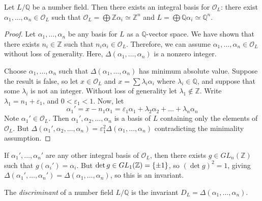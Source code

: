 \begin{theorem}
    Let \( L / \mathbb Q \) be a number field.
    Then there exists an integral basis for \( \mathcal O_L \): there exist \( \alpha_1, \dots, \alpha_n \in \mathcal O_L \) such that \( \mathcal O_L = \bigoplus \mathbb Z \alpha_i \simeq \mathbb Z^n \) and \( L = \bigoplus \mathbb Q \alpha_i \simeq \mathbb Q^n \).
\end{theorem}
\begin{proof}
    Let \( \alpha_1, \dots, \alpha_n \) be any basis for \( L \) as a \( \mathbb Q \)-vector space.
    We have shown that there exists \( n_i \in \mathbb Z \) such that \( n_i \alpha_i \in \mathcal O_L \).
    Therefore, we can assume \( \alpha_1, \dots, \alpha_n \in \mathcal O_L \) without loss of generality.
    Here, \( \Delta(\alpha_1, \dots, \alpha_n) \) is a nonzero integer.

    Choose \( \alpha_1, \dots, \alpha_n \) such that \( \Delta(\alpha_1, \dots, \alpha_n) \) has minimum absolute value.
    Suppose the result is false, so let \( x \in \mathcal O_L \) and \( x = \sum \lambda_i \alpha_i \) where \( \lambda_i \in \mathbb Q \), and suppose that some \( \lambda_i \) is not an integer.
    Without loss of generality let \( \lambda_1 \not\in \mathbb Z \).
    Write \( \lambda_1 = n_1 + \varepsilon_1 \), and \( 0 < \varepsilon_1 < 1 \).
    Now, let
    \[ \alpha_1' = x - n_1 \alpha_1 = \varepsilon_1 \alpha_1 + \lambda_2 \alpha_2 + \dots + \lambda_n \alpha_n \]
    Note \( \alpha_1' \in \mathcal O_L \).
    Then \( \alpha_1', \alpha_2, \dots, \alpha_n \) is a basis of \( L \) containing only the elements of \( \mathcal O_L \).
    But \( \Delta(\alpha_1', \alpha_2, \dots, \alpha_n) = \varepsilon_1^2 \Delta(\alpha_1, \dots, \alpha_n) \) contradicting the minimality assumption.
\end{proof}
\begin{remark}
    If \( \alpha_1', \dots, \alpha_n' \) are any other integral basis of \( \mathcal O_L \), then there exists \( g \in GL_n(\mathbb Z) \) such that \( g(\alpha_i') = \alpha_i \).
    But \( \det g \in GL_1(\mathbb Z) = \qty{\pm 1} \), so \( (\det g)^2 = 1 \), giving \( \Delta(\alpha_1', \dots, \alpha_n') = \Delta(\alpha_1, \dots, \alpha_n) \), so this is an invariant.
\end{remark}
\begin{definition}
    The \emph{discriminant} of a number field \( L / \mathbb Q \) is the invariant \( D_L = \Delta(\alpha_1, \dots, \alpha_n) \).
\end{definition}
